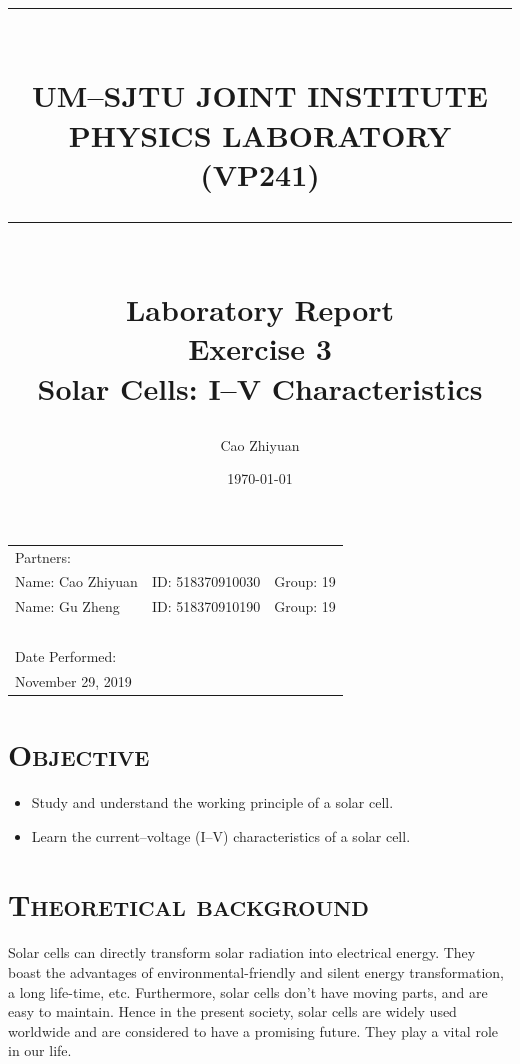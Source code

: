 \documentclass[a4paper,12pt]{article}
\title{\rule{\textwidth}{0.3mm} \\UM–SJTU JOINT INSTITUTE \\ PHYSICS LABORATORY \\ (VP241) \\ \rule{\textwidth}{0.3mm} \\ [30 mm]  \Large{Laboratory Report} \\[5 mm]  Exercise 3 \\[1 mm] 
Solar Cells: I–V Characteristics \\[20 mm]} %
\author{Cao Zhiyuan} %
\date{\today} %
\begin{document}
\scshape

\maketitle %

\begin{center}
\begin{tabular}{l l l}
\\[5 mm]
Partners:  \\
Name: Cao Zhiyuan & ID: 518370910030 & Group: 19 \\
Name: Gu Zheng & ID: 518370910190 & Group: 19 \\
~\\
Date Performed:\\
November 29, 2019\\
\end{tabular}
\end{center}

\thispagestyle{empty}


\newpage


\small\tableofcontents
\thispagestyle{empty}


\newpage

\setcounter{page}{1}
\upshape
\section{\textsc{Objective}}
\begin{itemize}
\item Study and understand the working principle of a solar cell.
\item Learn the current–voltage (I–V) characteristics of a solar cell.
\end{itemize}

\section{\textsc{Theoretical background}}
Solar cells can directly transform solar radiation into electrical energy. They boast the advantages of environmental-friendly and silent energy transformation, a long life-time, etc. Furthermore, solar cells don't have moving parts, and are easy to maintain. Hence in the present society, solar cells are widely used worldwide and are considered to have a promising future. They play a vital role in our life.
\end{document}
